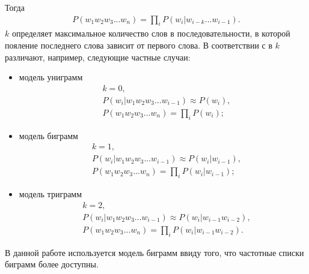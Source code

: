 Тогда
\begin{align}
	P(w_1w_2w_3...w_n) = \prod_{i}P(w_i|w_{i-k}...w_{i-1}).
\end{align}
\(k\) определяет максимальное количество слов в последовательности, в которой пояление последнего слова зависит от первого слова. В соответствии с в \(k\) различают, например, следующие частные случаи:
\begin{itemize}
	\item
	модель униграмм
	\begin{align}
		&k = 0, \nonumber \\
		&P(w_i|w_1w_2w_3...w_{i-1}) \approx P(w_i), \\
		&P(w_1w_2w_3...w_n) = \prod_{i}P(w_i); 
	\end{align}
	\item
	модель биграмм
	\begin{align}
		&k = 1, \nonumber \\
		&P(w_i|w_1w_2w_3...w_{i-1}) \approx P(w_i|w_{i-1}), \\
		&P(w_1w_2w_3...w_n) = \prod_{i}P(w_i|w_{i-1});
	\end{align}
	\item
	модель триграмм
	\begin{align}
		&k = 2, \nonumber \\
		&P(w_i|w_1w_2w_3...w_{i-1}) \approx P(w_i|w_{i-1}w_{i-2}), \\
		&P(w_1w_2w_3...w_n) = \prod_{i}P(w_i|w_{i-1}w_{i-2}).
	\end{align}
\end{itemize}
В данной работе используется модель биграмм ввиду того, что частотные списки биграмм более доступны.
